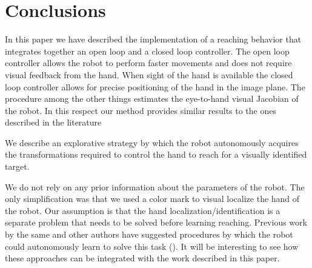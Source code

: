 \section{Conclusions}
In this paper we have described the implementation of a reaching
behavior that integrates together an open loop and a closed 
loop controller. The open loop controller
allows the robot to perform faster movements and does not require visual 
feedback from the hand. When sight of the hand is available the closed
loop controller allows for precise positioning of the hand in the 
image plane. The procedure among the other things estimates the eye-to-hand
visual Jacobian of the robot. In this respect our method provides
similar results to the ones described in the literature \cite{}

We describe an explorative strategy by which the robot autonomously 
acquires the transformations required to control the hand to reach for a
visually identified target.

We do not rely on any prior information about the 
parameters of the robot. The only simplification was that we used 
a color mark to visual localize the hand of the robot. Our assumption
is that the hand localization/identification is a separate problem
that needs to be solved before learning reaching. Previous work
by the same and other authors have suggested procedures by which 
the robot could autonomously learn to solve this task 
(\cite{Natale05,edsinger06what}). It will be interesting to see
how these approaches can be integrated with the work described 
in this paper.
